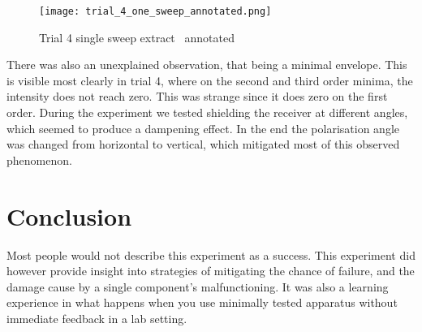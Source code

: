\begin{wrapfigure}{r}{0.45\textwidth}
	\centering
	\texttt{[image: trial\_4\_one\_sweep\_annotated.png]}
	\caption{Trial 4 single sweep extract \textemdash \, annotated}
\end{wrapfigure} 
There was also an unexplained observation, that being a minimal envelope. This is visible most clearly in trial 4, where on the second and third order minima, the intensity does not reach zero. This was strange since it does zero on the first order. During the experiment we tested shielding the receiver at different angles, which seemed to produce a dampening effect. In the end the polarisation angle was changed from horizontal to vertical, which mitigated most of this observed phenomenon.

\section*{Conclusion}

Most people would not describe this experiment as a success.
This experiment did however provide insight into strategies of mitigating the chance of failure, and the damage cause by a single component's malfunctioning.
It was also a learning experience in what happens when you use minimally tested apparatus without immediate feedback in a lab setting.




